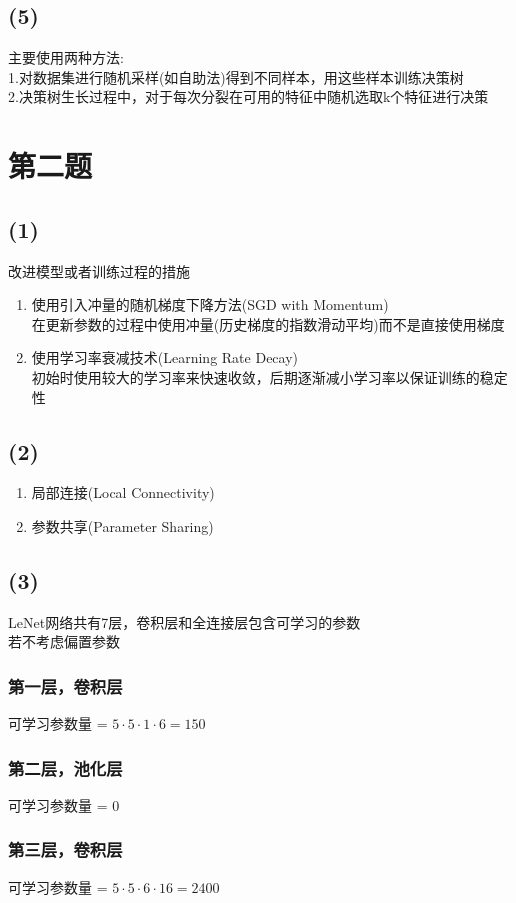 \documentclass[12pt,a4paper]{article}
\begin{document}
\subsection*{(5)}
主要使用两种方法:\\
1.对数据集进行随机采样(如自助法)得到不同样本，用这些样本训练决策树\\
2.决策树生长过程中，对于每次分裂在可用的特征中随机选取k个特征进行决策
\section{第二题}
\subsection*{(1)}
改进模型或者训练过程的措施
\begin{enumerate}
    \item 使用引入冲量的随机梯度下降方法(SGD with Momentum)\\
          在更新参数的过程中使用冲量(历史梯度的指数滑动平均)而不是直接使用梯度
    \item 使用学习率衰减技术(Learning Rate Decay)\\
          初始时使用较大的学习率来快速收敛，后期逐渐减小学习率以保证训练的稳定性
\end{enumerate}
\subsection*{(2)}
\begin{enumerate}
    \item 局部连接(Local Connectivity)
    \item 参数共享(Parameter Sharing)
\end{enumerate}
\subsection*{(3)}
LeNet网络共有7层，卷积层和全连接层包含可学习的参数\\
若不考虑偏置参数
\subsubsection*{第一层，卷积层}
可学习参数量 = $5\cdot 5\cdot 1\cdot6 = 150$
\subsubsection*{第二层，池化层}
可学习参数量 = $0$
\subsubsection*{第三层，卷积层}
可学习参数量 = $5\cdot 5\cdot 6\cdot16 = 2400$
\end{document}
